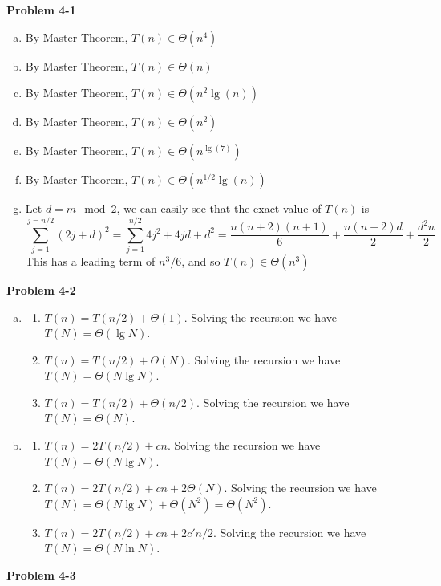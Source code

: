 \documentclass{article}
\begin{document}
\noindent\textbf{Problem 4-1}\\

\begin{enumerate}[a.]
\item
By Master Theorem, $T(n) \in \Theta(n^4)$

\item
By Master Theorem, $T(n) \in \Theta(n)$

\item
By Master Theorem, $T(n) \in \Theta(n^2\lg(n))$

\item
By Master Theorem, $T(n) \in \Theta(n^2)$

\item
By Master Theorem, $T(n) \in \Theta(n^{\lg(7)})$

\item
By Master Theorem, $T(n) \in \Theta(n^{1/2}\lg(n))$

\item
Let $d = m\mod 2$, we can easily see that the exact value of $T(n)$ is
\[
\sum_{j=1}^{j=n/2} (2j+d)^2 = \sum_{j=1}^{n/2}4j^2 + 4jd + d^2 = \frac{n(n+2)(n+1)}{6} + \frac{n(n+2)d}{2} + \frac{d^2n}{2}
\]
This has a leading term of $n^3/6$, and so $T(n) \in \Theta(n^3)$

\end{enumerate}

\noindent\textbf{Problem 4-2}\\
\begin{enumerate}[a.]
\item 
\begin{enumerate}[1.]
\item $T(n) = T(n/2) + \Theta(1)$.  Solving the recursion we have $T(N) = \Theta(\lg N)$.

\item $T(n) = T(n/2) + \Theta(N)$.  Solving the recursion we have $T(N) = \Theta(N \lg N)$.

\item $T(n) = T(n/2) + \Theta(n/2)$. Solving the recursion we have $T(N) = \Theta(N)$. \\

\end{enumerate}
\item
\begin{enumerate}[1.]
  \item $T(n) = 2T(n/2) + cn$. Solving the recursion we have $T(N) = \Theta(N\lg N)$.

\item $T(n) = 2T(n/2) + cn + 2\Theta(N)$.  Solving the recursion we have $T(N) = \Theta(N\lg N) + \Theta(N^2) = \Theta(N^2)$.

\item $T(n) = 2T(n/2) + cn + 2c'n/2$.  Solving the recursion we have $T(N) = \Theta(N\ln N)$. \\

\end{enumerate}
\end{enumerate}
\noindent\textbf{Problem 4-3}\\
\end{document}
